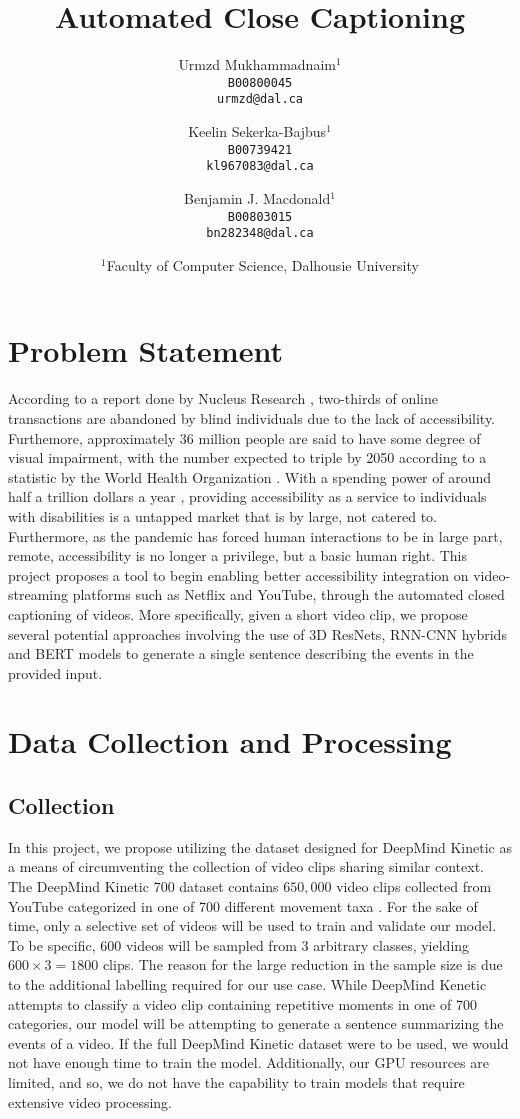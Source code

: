\documentclass[10pt]{article}
\title{Automated Close Captioning}
\author{
Urmzd Mukhammadnaim$^1$\\
\texttt{B00800045} \\
\texttt{urmzd@dal.ca} \\
\and
Keelin Sekerka-Bajbus$^1$\\
\texttt{B00739421}\\
\texttt{kl967083@dal.ca}
\fig
\and
Benjamin J. Macdonald$^1$\\
\texttt{B00803015}\\
\texttt{bn282348@dal.ca}
}
\date{
$^1$Faculty of Computer Science, Dalhousie University
}
\begin{document}
\maketitle

\section{Problem Statement}
According to a report done by Nucleus Research \cite{nucleus_research_2019}, two-thirds
of online transactions are abandoned by blind individuals due to the lack of accessibility.
Furthemore, approximately 36 million people are said to have some degree of visual impairment, with the number
expected to triple by 2050 according to a statistic by the World Health Organization \cite{world_health_organization_2021}.
With a spending power of around half a trillion dollars a year \cite{yin_smith_overton_shaewitz_2018}, providing accessibility
as a service to individuals with disabilities is a untapped market that is by large, not catered to.
Furthermore, as the pandemic has forced human interactions to be in large part, remote, accessibility is no longer
a privilege, but a basic human right. This project proposes a tool to begin enabling better accessibility
integration on video-streaming platforms such as Netflix and YouTube, through the automated
closed captioning of videos. More specifically, given a short video clip, we propose several potential approaches 
involving the use of 3D ResNets, RNN-CNN hybrids and BERT models to generate a single sentence describing the events in the provided input.

\section{Data Collection and Processing}

\subsection{Collection}
In this project, we propose utilizing the dataset designed for DeepMind Kinetic as a means of
circumventing the collection of video clips sharing similar context. 
The DeepMind Kinetic 700 dataset contains $650,000$ video clips collected from YouTube
categorized in one of 700 different movement taxa \cite{DBLP:journals/corr/abs-2010-10864}. 
For the sake of time, only a selective set of videos will be used to train and validate
our model. To be specific, $600$ videos will be sampled from $3$ arbitrary classes, yielding 
$600 \times 3 = 1800$ clips. The reason for the large reduction in the sample size is due to the additional labelling
required for our use case. While DeepMind Kenetic attempts to classify a video clip containing repetitive moments
in one of 700 categories, our model will be attempting to generate a sentence summarizing the events of a video.
If the full DeepMind Kinetic dataset were to be used, we would not have enough time to train the model.
Additionally, our GPU resources are limited, and so, we do not have the capability to train models
that require extensive video processing.
\end{document}
